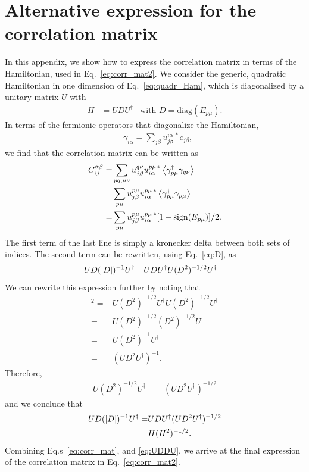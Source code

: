 \documentclass[twocolumn,amsmath,longbibliography,amssymb,superscriptaddress]{revtex4-1}
\begin{document}
\section{Alternative expression for the correlation matrix}\label{app:CM}
In this appendix, we show how to express the correlation matrix in terms of the Hamiltonian, used in Eq.~\eqref{eq:corr_mat2}. 
We consider the generic, quadratic Hamiltonian in one dimension of Eq.~\eqref{eq:quadr_Ham}, which is diagonalized by a unitary matrix $U$ with 
	\begin{align}\label{eq:D}
	H&=UDU^\dagger& \mbox{with } D=\mbox{diag}(E_{p\mu}).
	\end{align} 
In terms of the fermionic operators that diagonalize the Hamiltonian, 
\begin{align}
& \gamma_{i\alpha} = \sum_{j\beta}u_{j\beta}^{i\alpha \, \ast} c_{j\beta},
\end{align}
we find that the correlation matrix can be written as 
\begin{align}\label{eq:corr_mat}
C_{ij}^{\alpha \beta} =& \sum_{pq,\mu\nu} u^{q\nu }_{j\beta} u^{p\mu \, \ast}_{i\alpha} \expval{\gamma^\dagger_{p\mu} \gamma_{q\nu} }\nonumber \\
=&  \sum_{p\mu} u^{p\mu }_{j\beta} u^{p\mu \, \ast}_{i\alpha} \expval{\gamma^\dagger_{p\mu} \gamma_{p\mu} }\nonumber \\
=&  \sum_{p\mu} u^{p\mu }_{j\beta} u^{p\mu \, \ast}_{i\alpha} [1-{\rm sign}(E_{p\mu})]/2.
\end{align}
The first term of the last line is simply a kronecker delta between both sets of indices. The second term can be rewritten, using Eq.~\eqref{eq:D}, as
\begin{align}
UD(\abs{D})^{-1}U^\dagger =& UDU^\dagger U(D^2)^{-1/2}U^\dagger
\end{align}
We can rewrite this expression further by noting that 
\begin{align}
[U (D^2)^{-1/2} U^\dagger]^2 =& U (D^2)^{-1/2} U^\dagger U  (D^2)^{-1/2} U^\dagger \nonumber\\
=&  U (D^2)^{-1/2}  (D^2)^{-1/2} U^\dagger \nonumber\\
=&  U (D^2)^{-1} U^\dagger \nonumber\\
=&  (U D^2 U^\dagger)^{-1}.
\end{align}
Therefore,
\begin{align*}
U (D^2)^{-1/2} U^\dagger =&(U D^2 U^\dagger)^{-1/2} 
\end{align*}
and we conclude that
\begin{align}\label{eq:UDDU}
UD(\abs{D})^{-1}U^\dagger =& UDU^\dagger(U D^2 U^\dagger)^{-1/2} \nonumber\\ 
=& H(H^2)^{-1/2}.
\end{align}
Combining Eq.s~\eqref{eq:corr_mat},  and \eqref{eq:UDDU}, we arrive at the final expression of the correlation matrix in Eq.~\eqref{eq:corr_mat2}. 
\end{document}
